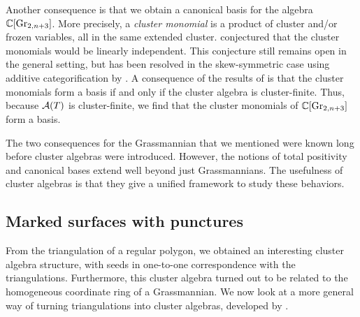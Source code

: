 Another consequence is that we obtain a canonical basis for the algebra $\mathbb{C}[\operatorname{Gr}_{2,
			n+3}]$. More precisely, a \emph{cluster monomial} is a product
of cluster and/or frozen variables, all in the same extended cluster.
\Textcite{FominZelevinsky2002CAF} conjectured that the cluster monomials would be
linearly independent. This conjecture still remains open in the general setting, but
has been resolved in the skew-symmetric case using additive categorification by
\textcite{CerulliKeller2013LinearIndependenceCMSSCA}. A consequence of the results of
\textcite{GrossHackingKeelKontsevich2018CanonicalBCA} is that the cluster monomials
form a basis if and only if the cluster algebra is cluster-finite. Thus, because
$\mathcal{A}(T)$ is cluster-finite, we find that the cluster monomials of $\mathbb{C}[\operatorname{Gr}_{2, n+3}]$
form a basis.

The two consequences for the Grassmannian that we mentioned were known long before
cluster algebras were introduced. However, the notions of total positivity and
canonical bases extend well beyond just Grassmannians. The usefulness of cluster
algebras is that they give a unified framework to study these behaviors.

\subsection{Marked surfaces with punctures}\label{sec:triangulations_of_surfaces}

From the triangulation of a regular polygon, we obtained an interesting cluster algebra
structure, with seeds in one-to-one correspondence with the triangulations.
Furthermore, this cluster algebra turned out to be related to the homogeneous
coordinate ring of a Grassmannian. We now look at a more general way of turning
triangulations into cluster algebras, developed by
\textcite{FominShapiroThurston2008CATriangulatedSurfacesI}.


